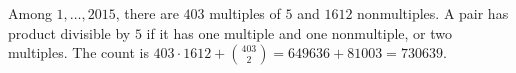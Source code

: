 Among $1,\ldots,2015$, there are $403$ multiples of $5$ and $1612$ nonmultiples. A pair has product divisible by $5$ if it has one multiple and one nonmultiple, or two multiples. The count is $403\cdot1612+\binom{403}{2}=649636+81003=\boxed{730639}$.
